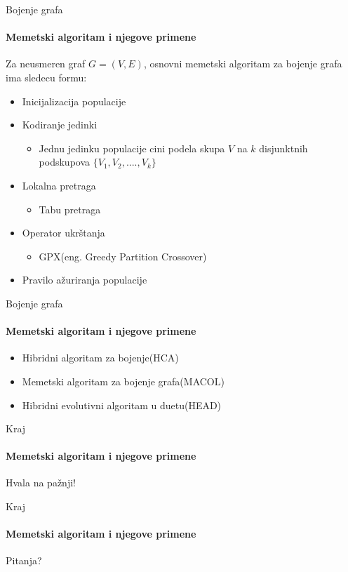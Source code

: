\documentclass{beamer}
\begin{document}
\begin{frame}[fragile]{Bojenje grafa}
  \framesubtitle{Memetski algoritam i njegove primene}

Za neusmeren graf $G = (V, E)$, osnovni memetski algoritam za bojenje grafa ima sledecu formu:
   \begin{itemize}
    \item{Inicijalizacija populacije}
    \item{Kodiranje jedinki}
        \begin{itemize}
            \item Jednu jedinku populacije cini podela skupa $V$ na $k$  disjunktnih podskupova $\{V_1, V_2, ...., V_k\}$
        \end{itemize}
    \item{Lokalna pretraga}
        \begin{itemize}
            \item Tabu pretraga
        \end{itemize}
    \item{Operator ukrštanja}
        \begin{itemize}
            \item GPX(eng. Greedy Partition Crossover)
        \end{itemize}
    \item{Pravilo ažuriranja populacije}
  \end{itemize}



\end{frame}




\begin{frame}[fragile]{Bojenje grafa}
  \framesubtitle{Memetski algoritam i njegove primene}

   \begin{itemize}
    \item{Hibridni algoritam za bojenje(HCA)}
    \item{Memetski algoritam za bojenje grafa(MACOL)}
    \item{Hibridni evolutivni algoritam u duetu(HEAD)}
  \end{itemize}
  

\end{frame}


\begin{frame}{Kraj}
  \framesubtitle{Memetski algoritam i njegove primene}

  
\centering
\Huge{Hvala na pažnji!}

\end{frame}




\begin{frame}{Kraj}
  \framesubtitle{Memetski algoritam i njegove primene}
\centering
\Huge{Pitanja?}

\end{frame}
\end{document}
